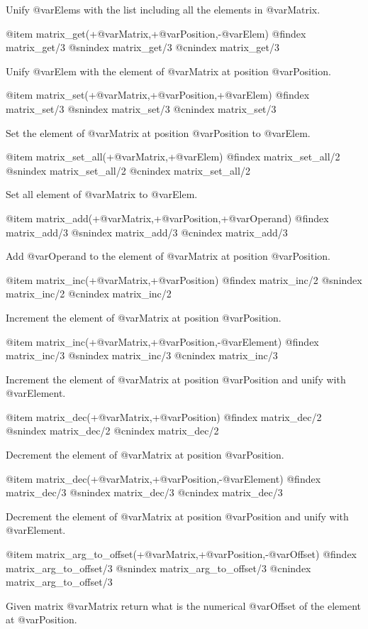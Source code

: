 {{{{{{{{{Unify @var{Elems} with the list including all the elements in @var{Matrix}.

@item matrix_get(+@var{Matrix},+@var{Position},-@var{Elem})
@findex matrix_get/3
@snindex matrix_get/3
@cnindex matrix_get/3

Unify @var{Elem} with the element of @var{Matrix} at position
@var{Position}.

@item matrix_set(+@var{Matrix},+@var{Position},+@var{Elem})
@findex matrix_set/3
@snindex matrix_set/3
@cnindex matrix_set/3

Set the element of @var{Matrix} at position
@var{Position} to  @var{Elem}.

@item matrix_set_all(+@var{Matrix},+@var{Elem})
@findex matrix_set_all/2
@snindex matrix_set_all/2
@cnindex matrix_set_all/2

Set all element of @var{Matrix} to @var{Elem}.

@item matrix_add(+@var{Matrix},+@var{Position},+@var{Operand})
@findex matrix_add/3
@snindex matrix_add/3
@cnindex matrix_add/3

Add @var{Operand} to the element of @var{Matrix} at position
@var{Position}.

@item matrix_inc(+@var{Matrix},+@var{Position})
@findex matrix_inc/2
@snindex matrix_inc/2
@cnindex matrix_inc/2

Increment the element of @var{Matrix} at position @var{Position}.

@item matrix_inc(+@var{Matrix},+@var{Position},-@var{Element})
@findex matrix_inc/3
@snindex matrix_inc/3
@cnindex matrix_inc/3

Increment the element of @var{Matrix} at position @var{Position} and
unify with @var{Element}.

@item matrix_dec(+@var{Matrix},+@var{Position})
@findex matrix_dec/2
@snindex matrix_dec/2
@cnindex matrix_dec/2

Decrement the element of @var{Matrix} at position @var{Position}.

@item matrix_dec(+@var{Matrix},+@var{Position},-@var{Element})
@findex matrix_dec/3
@snindex matrix_dec/3
@cnindex matrix_dec/3

Decrement the element of @var{Matrix} at position @var{Position} and
unify with @var{Element}.

@item matrix_arg_to_offset(+@var{Matrix},+@var{Position},-@var{Offset})
@findex matrix_arg_to_offset/3
@snindex matrix_arg_to_offset/3
@cnindex matrix_arg_to_offset/3

Given matrix @var{Matrix} return what is the numerical @var{Offset} of
the element at @var{Position}.

}}}}}}}}}

